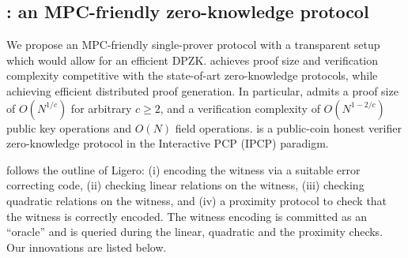 \subsection{\name{}: an MPC-friendly zero-knowledge protocol}
We propose an MPC-friendly single-prover protocol \name{} with a transparent setup which would allow for an efficient  DPZK.
\name{} achieves proof size and verification complexity competitive with the state-of-art zero-knowledge protocols, while achieving efficient distributed proof generation. In particular, \name{} admits a proof size of $O(N^{1/c})$ for arbitrary $c\geq 2$, and a verification complexity of $O(N^{1-2/c})$ public key operations and $O(N)$ field operations. \name{} is a public-coin honest verifier zero-knowledge protocol in the Interactive PCP (IPCP) \cite{KR08, KR09, GIMS10} paradigm. %


%

\name{} follows the outline of Ligero: (i) encoding the witness via a suitable error correcting code, (ii) checking linear relations on the witness, (iii) checking quadratic relations on the witness, and (iv) a proximity protocol to check that the witness is correctly encoded. The witness encoding is committed as an ``oracle'' and is queried during the linear, quadratic and the proximity checks.  Our innovations are listed below.
